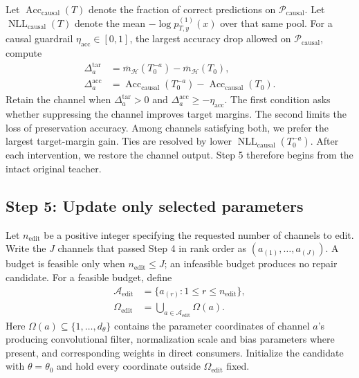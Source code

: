 \documentclass[review,number,sort&compress]{elsarticle}
\theoremstyle{definition}
\begin{document}
Let $\operatorname{Acc}_{\mathrm{causal}}(T)$ denote the
fraction of correct predictions on
$\mathcal P_{\mathrm{causal}}$. Let
$\operatorname{NLL}_{\mathrm{causal}}(T)$ denote the mean
$-\log p_{T,y}^{(1)}(x)$ over that same pool.
For a causal guardrail $\eta_{\mathrm{acc}}\in[0,1]$, the largest
accuracy drop allowed on $\mathcal P_{\mathrm{causal}}$, compute
\begin{equation}
\label{eq:repair-causal-gate}
\begin{aligned}
\Delta_a^{\mathrm{tar}}
&=\overline m_{\mathcal H}(T_0^{-a})
 -\overline m_{\mathcal H}(T_0),\\
\Delta_a^{\mathrm{acc}}
&=\operatorname{Acc}_{\mathrm{causal}}(T_0^{-a})
 -\operatorname{Acc}_{\mathrm{causal}}(T_0).
\end{aligned}
\end{equation}
Retain the channel when $\Delta_a^{\mathrm{tar}}>0$ and
$\Delta_a^{\mathrm{acc}}\geq-\eta_{\mathrm{acc}}$.
The first condition asks whether suppressing the channel
improves target margins. The second limits the loss of
preservation accuracy. Among channels satisfying both,
we prefer the largest target-margin gain. Ties are resolved
by lower $\operatorname{NLL}_{\mathrm{causal}}(T_0^{-a})$.
After each intervention, we restore the channel output.
Step 5 therefore begins from the intact original teacher.

\subsection{Step 5: Update only selected parameters}

Let $n_{\mathrm{edit}}$ be a positive integer specifying the
requested number of channels to edit. Write the $J$ channels
that passed Step 4 in rank order as
$(a_{(1)},\ldots,a_{(J)})$. A budget is feasible only when
$n_{\mathrm{edit}}\leq J$; an infeasible budget produces no
repair candidate. For a feasible budget, define
\begin{equation}
\label{eq:repair-edit-support}
\begin{aligned}
\mathcal A_{\mathrm{edit}}
&=\{a_{(r)}:1\leq r\leq n_{\mathrm{edit}}\},\\
\Omega_{\mathrm{edit}}
&=\bigcup_{a\in\mathcal A_{\mathrm{edit}}}\Omega(a).
\end{aligned}
\end{equation}
Here $\Omega(a)\subseteq\{1,\ldots,d_\theta\}$ contains the
parameter coordinates of channel $a$'s producing
convolutional filter, normalization scale and bias
parameters where present, and corresponding weights in
direct consumers. Initialize the candidate with
$\theta=\theta_0$ and hold every coordinate outside
$\Omega_{\mathrm{edit}}$ fixed.
\end{document}
